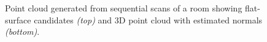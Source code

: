 			\begin{figure}[!h]
				\centering
				\caption{Point cloud generated from sequential scans of a room showing flat-surface candidates \emph{(top)} and 3D point cloud with estimated normals \emph{(bottom)}.}
				\label{fig::surface_estimation}
			\end{figure}
